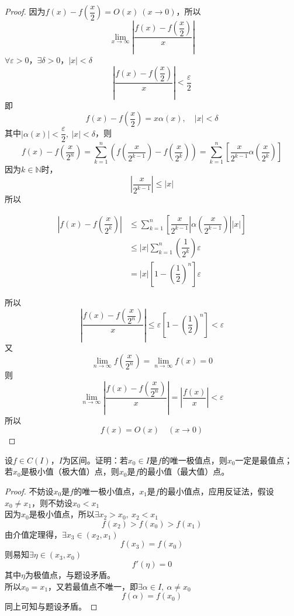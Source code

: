 \begin{proof}

    因为$f(x) - f(\dfrac{x}{2}) = O(x) \ (x\to 0)$，所以
    $$\lim_{x\to\infty}{\left| \dfrac{f(x) - f(\dfrac{x}{2})}{x} \right|}$$
    $\forall \varepsilon > 0$，$\exists \delta > 0$，$|x| < \delta$
    $$\left| \dfrac{f(x) - f(\dfrac{x}{2})}{x} \right| < \dfrac{\varepsilon}{2}$$
    即
    $$f(x) - f\left(\dfrac{x}{2}\right) = x\alpha(x),\quad |x| < \delta$$
    其中$|\alpha(x)| < \dfrac{\varepsilon}{2},\ |x| < \delta$，则
    $$f(x) - f\left(\dfrac{x}{2^n}\right) = \sum_{k=1}^{n}{\left( f\left(\dfrac{x}{2^{k-1}}\right) - f\left(\dfrac{x}{2^k}\right) \right)} = \sum_{k=1}^{n}{\left[ \dfrac{x}{2^{k-1}}\alpha(\dfrac{x}{2^k}) \right]}$$
    因为$k \in \mathbb{N}$时，
    $$\left| \dfrac{x}{2^{k-1}} \right| \leq |x|$$
    所以

    \begin{align*}
        \left|f(x) - f\left(\dfrac{x}{2^k}\right)\right| & \leq \sum_{k=1}^{n}{\left[\dfrac{x}{2^{k-1}}\left|\alpha\left(\dfrac{x}{2^{k-1}}\right)\right| |x| \right]} \\
        & \leq |x| \sum_{k=1}^{n}{\left(\dfrac{1}{2^k}\right)} \varepsilon \\
        & = |x| \left[1 - \left(\dfrac{1}{2}\right)^n \right] \varepsilon 
    \end{align*}

    所以
    $$\left| \dfrac{f(x) - f\left(\dfrac{x}{2^n}\right)}{x} \right| \leq \varepsilon \left[1 - \left(\dfrac{1}{2}\right)^n \right] < \varepsilon$$
    又
    $$\lim_{n\to\infty}{f(\dfrac{x}{2^n})} = \lim_{n\to\infty}{f(x)} = 0$$
    则
    $$\lim_{n\to\infty}{\left| \dfrac{f(x) - f(\dfrac{x}{2^n})}{x} \right|} = \left| \dfrac{f(x)}{x} \right| < \varepsilon $$
    所以
    $$f(x) = O(x) \quad (x \to 0)$$

\end{proof}

\begin{proposition}

    设$f \in C(I)$，$I$为区间。证明：若$x_0 \in I$是$f$的唯一极值点，则$x_0$一定是最值点；若$x_0$是极小值（极大值）点，则$x_0$是$f$的最小值（最大值）点。

\end{proposition}

\begin{proof}

    不妨设$x_0$是$f$的唯一极小值点，$x_1$是$f$的最小值点，应用反证法，假设$x_0 \neq x_1$，则不妨设$x_0 < x_1$\\
    因为$x_0$是极小值点，所以$\exists x_2 > x_0,\ x_2 < x_1$
    $$f(x_2) > f(x_0) > f(x_1)$$
    由介值定理得，$\exists x_3 \in (x_2, x_1)$
    $$f(x_3) = f(x_0)$$
    则易知$\exists \eta \in (x_3, x_0)$
    $$f'(\eta) = 0$$
    其中$\eta$为极值点，与题设矛盾。\\
    所以$x_0 = x_1$，又若最值点不唯一，即$\exists \alpha \in I,\ \alpha \neq x_0$
    $$f(\alpha) = f(x_0)$$
    同上可知与题设矛盾。

\end{proof}


